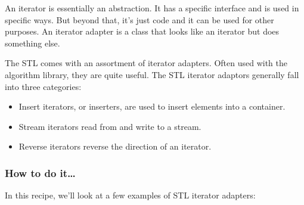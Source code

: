 
An iterator is essentially an abstraction. It has a specific interface and is used in specific ways. But beyond that, it's just code and it can be used for other purposes. An iterator adapter is a class that looks like an iterator but does something else.

The STL comes with an assortment of iterator adapters. Often used with the algorithm library, they are quite useful. The STL iterator adaptors generally fall into three categories:

\begin{itemize}
\item 
Insert iterators, or inserters, are used to insert elements into a container.

\item 
Stream iterators read from and write to a stream.

\item 
Reverse iterators reverse the direction of an iterator.
\end{itemize}

\subsubsection{How to do it…}

In this recipe, we'll look at a few examples of STL iterator adapters:

